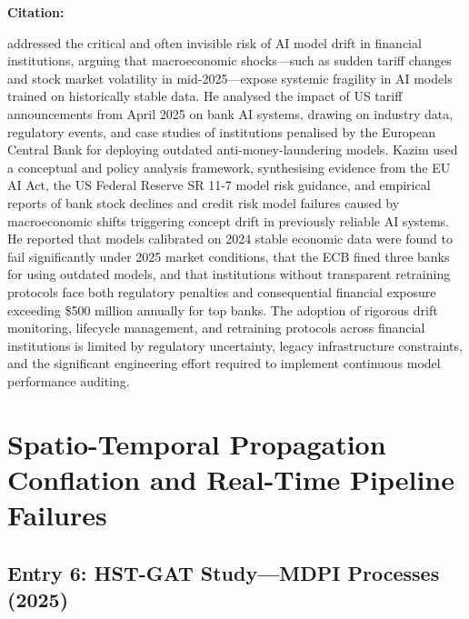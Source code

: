 \documentclass[12pt, a4paper]{article}
\newenvironment{surveyentry}[1]{%
  \vspace{6pt}
  \noindent\textbf{\color{navyblue}#1}\par
  \vspace{2pt}
  \noindent\hspace{1em}%
  \begin{minipage}[t]{0.97\linewidth}
}{%
  \end{minipage}
  \vspace{10pt}
}
\begin{document}
\begin{surveyentry}{Citation: \cite{kazim2025drift}}
\cite{kazim2025drift} addressed the critical and often invisible risk of AI model drift in financial institutions, arguing that macroeconomic shocks---such as sudden tariff changes and stock market volatility in mid-2025---expose systemic fragility in AI models trained on historically stable data. He analysed the impact of US tariff announcements from April 2025 on bank AI systems, drawing on industry data, regulatory events, and case studies of institutions penalised by the European Central Bank for deploying outdated anti-money-laundering models. Kazim used a conceptual and policy analysis framework, synthesising evidence from the EU AI Act, the US Federal Reserve SR 11-7 model risk guidance, and empirical reports of bank stock declines and credit risk model failures caused by macroeconomic shifts triggering concept drift in previously reliable AI systems. He reported that models calibrated on 2024 stable economic data were found to fail significantly under 2025 market conditions, that the ECB fined three banks for using outdated models, and that institutions without transparent retraining protocols face both regulatory penalties and consequential financial exposure exceeding \$500 million annually for top banks. The adoption of rigorous drift monitoring, lifecycle management, and retraining protocols across financial institutions is limited by regulatory uncertainty, legacy infrastructure constraints, and the significant engineering effort required to implement continuous model performance auditing.
\end{surveyentry}

\section{Spatio-Temporal Propagation Conflation and Real-Time Pipeline Failures}

\subsection*{Entry 6: HST-GAT Study---MDPI Processes (2025)}
\end{document}
